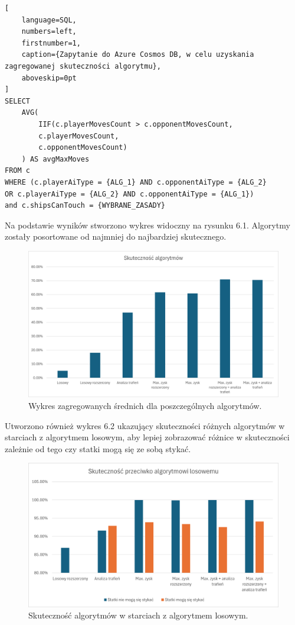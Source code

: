 \begin{addmargin}[10mm]{0mm}
\begin{lstlisting}[
    language=SQL,
    numbers=left,
    firstnumber=1,
    caption={Zapytanie do Azure Cosmos DB, w celu uzyskania zagregowanej skuteczności algorytmu},
    aboveskip=0pt
]
SELECT 
    AVG(
        IIF(c.playerMovesCount > c.opponentMovesCount,
        c.playerMovesCount,
        c.opponentMovesCount)
    ) AS avgMaxMoves
FROM c
WHERE (c.playerAiType = {ALG_1} AND c.opponentAiType = {ALG_2}
OR c.playerAiType = {ALG_2} AND c.opponentAiType = {ALG_1})
and c.shipsCanTouch = {WYBRANE_ZASADY}
\end{lstlisting}
\end{addmargin}

Na podstawie wyników stworzono wykres widoczny na rysunku 6.1. Algorytmy zostały posortowane od najmniej do najbardziej skutecznego.

\begin{figure}[!h]
    \label{fig:aggregate-chart}
    \centering \includegraphics[width=0.9\linewidth]{img/aggregate-chart.png}
    \caption{Wykres zagregowanych średnich dla poszczególnych algorytmów.}
\end{figure}

Utworzono również wykres 6.2 ukazujący skuteczności różnych algorytmów w starciach z algorytmem losowym, aby lepiej zobrazować różnice w skuteczności zależnie od tego czy statki mogą się ze sobą stykać.

\begin{figure}[!h]
    \label{fig:round-avg}
    \centering \includegraphics[width=0.9\linewidth]{img/chart-random-scores.png}
    \caption{Skuteczność algorytmów w starciach z algorytmem losowym.}
\end{figure}

